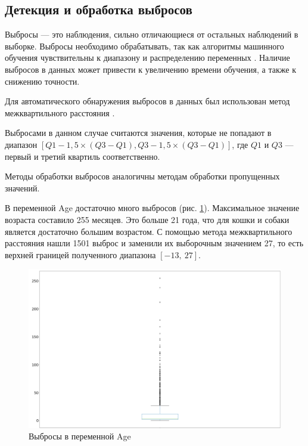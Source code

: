 \documentclass[14pt]{mmcs_article}
\begin{document}
\subsection{Детекция и обработка выбросов}

Выбросы — это наблюдения, сильно отличающиеся от остальных наблюдений в выборке. Выбросы необходимо обрабатывать, так как алгоритмы машинного обучения чувствительны к диапазону и распределению переменных \cite{lib:outlier}. Наличие выбросов в данных может привести к увеличению времени обучения, а также к снижению точности.

Для автоматического обнаружения выбросов в данных был использован метод межквартильного расстояния \cite{lib:outlier2}. 

Выбросами в данном случае считаются значения, которые не попадают в диапазон $[Q1 - 1,5 \times (Q3 - Q1), Q3 - 1,5 \times (Q3 - Q1)]$, где $Q1$ и $Q3$ --- первый и третий квартиль соответственно.

Методы обработки выбросов аналогичны методам обработки пропущенных значений. 

В переменной Age достаточно много выбросов (рис. \ref{analyse:ageoutlier}). Максимальное значение возраста составило 255 месяцев. Это больше 21 года, что для кошки и собаки является достаточно большим возрастом. С помощью метода межквартильного расстояния нашли 1501 выброс и заменили их выборочным значением 27, то есть верхней границей полученного диапазона $[-13,\ 27]$.

\begin{figure}[H]
	\centering
	\includegraphics[scale=0.7]{ageoutlier.png}
	\caption{Выбросы в переменной Age}\label{analyse:ageoutlier}
\end{figure}
\end{document}
